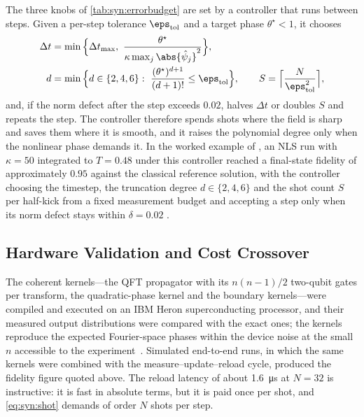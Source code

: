 The three knobs of \cref{tab:syn:errorbudget} are set by a controller that runs between steps. Given a per-step tolerance $\eps_{\mathrm{tol}}$ and a target phase $\theta^{\star}<1$, it chooses
\begin{equation}\label{eq:syn:controller}
\begin{aligned}
  \Delta t&=\min\Big\{\Delta t_{\max},\ \frac{\theta^{\star}}{\kappa\max_j\abs{\hat\psi_j}^{2}}\Big\},\\
  d&=\min\Big\{d\in\{2,4,6\}:\ \frac{(\theta^{\star})^{d+1}}{(d+1)!}\le\eps_{\mathrm{tol}}\Big\},\qquad
  S=\Big\lceil\frac{N}{\eps_{\mathrm{tol}}^{2}}\Big\rceil,
\end{aligned}
\end{equation}
and, if the norm defect after the step exceeds $0.02$, halves $\Delta t$ or doubles $S$ and repeats the step. The controller therefore spends shots where the field is sharp and saves them where it is smooth, and it raises the polynomial degree only when the nonlinear phase demands it. In the worked example of \cite{guo2026nonlinearwaves}, an NLS run with $\kappa=50$ integrated to $T=0.48$ under this controller reached a final-state fidelity of approximately $0.95$ against the classical reference solution, with the controller choosing the timestep, the truncation degree $d\in\{2,4,6\}$ and the shot count $S$ per half-kick from a fixed measurement budget and accepting a step only when its norm defect stays within $\delta=0.02$ \cite{guo2026nonlinearwaves}.

\subsection{Hardware Validation and Cost Crossover}\label{sec:syn:waves-results}

The coherent kernels---the QFT propagator with its $n(n-1)/2$ two-qubit gates per transform, the quadratic-phase kernel and the boundary kernels---were compiled and executed on an IBM Heron superconducting processor, and their measured output distributions were compared with the exact ones; the kernels reproduce the expected Fourier-space phases within the device noise at the small $n$ accessible to the experiment~\cite{guo2026nonlinearwaves}. Simulated end-to-end runs, in which the same kernels were combined with the measure--update--reload cycle, produced the fidelity figure quoted above. The reload latency of about \SI{1.6}{\micro\second} at $N=32$ is instructive: it is fast in absolute terms, but it is paid once per shot, and \cref{eq:syn:shot} demands of order $N$ shots per step.

